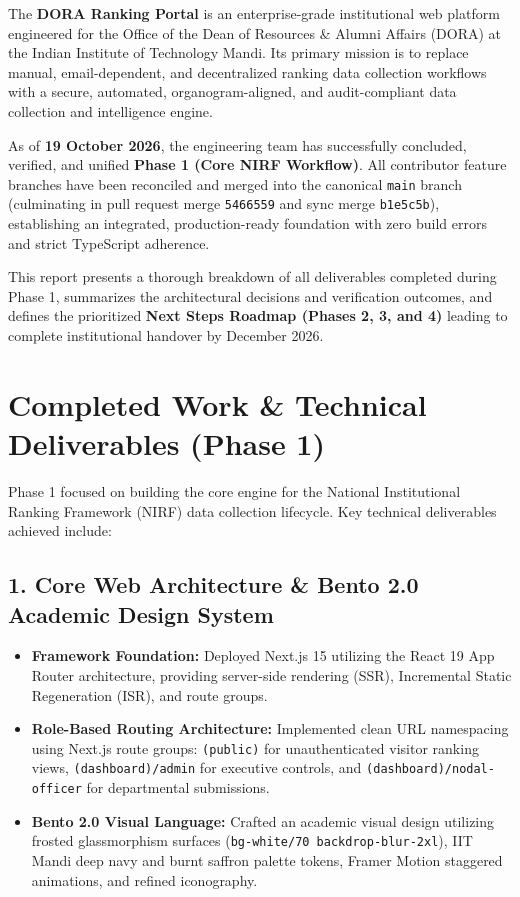 \documentclass[11pt,a4paper]{article}
\begin{document}
The \textbf{DORA Ranking Portal} is an enterprise-grade institutional web platform engineered for the Office of the Dean of Resources \& Alumni Affairs (DORA) at the Indian Institute of Technology Mandi. Its primary mission is to replace manual, email-dependent, and decentralized ranking data collection workflows with a secure, automated, organogram-aligned, and audit-compliant data collection and intelligence engine.

As of \textbf{19 October 2026}, the engineering team has successfully concluded, verified, and unified \textbf{Phase 1 (Core NIRF Workflow)}. All contributor feature branches have been reconciled and merged into the canonical \texttt{main} branch (culminating in pull request merge \texttt{5466559} and sync merge \texttt{b1e5c5b}), establishing an integrated, production-ready foundation with zero build errors and strict TypeScript adherence. 

This report presents a thorough breakdown of all deliverables completed during Phase 1, summarizes the architectural decisions and verification outcomes, and defines the prioritized \textbf{Next Steps Roadmap (Phases 2, 3, and 4)} leading to complete institutional handover by December 2026.

\section{Completed Work \& Technical Deliverables (Phase 1)}

Phase 1 focused on building the core engine for the National Institutional Ranking Framework (NIRF) data collection lifecycle. Key technical deliverables achieved include:

\subsection{1. Core Web Architecture \& Bento 2.0 Academic Design System}
\begin{itemize}[leftmargin=1.4em, itemsep=2pt]
\item \textbf{Framework Foundation:} Deployed Next.js 15 utilizing the React 19 App Router architecture, providing server-side rendering (SSR), Incremental Static Regeneration (ISR), and route groups.
\item \textbf{Role-Based Routing Architecture:} Implemented clean URL namespacing using Next.js route groups: \texttt{(public)} for unauthenticated visitor ranking views, \texttt{(dashboard)/admin} for executive controls, and \texttt{(dashboard)/nodal-officer} for departmental submissions.
\item \textbf{Bento 2.0 Visual Language:} Crafted an academic visual design utilizing frosted glassmorphism surfaces (\texttt{bg-white/70 backdrop-blur-2xl}), IIT Mandi deep navy and burnt saffron palette tokens, Framer Motion staggered animations, and refined iconography.
\end{itemize}
\end{document}
